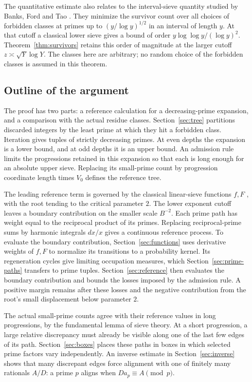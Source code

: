 The quantitative estimate also relates to the interval-sieve quantity
studied by Banks, Ford and Tao \cite[Sections~1.3--1.4]{BanksFordTao2023}.
They minimize the survivor count over all choices of forbidden classes
at primes up to $(y/\log y)^{1/2}$ in an interval of length $y$.
At that cutoff a classical lower sieve gives a bound of order
$y\log\log y/(\log y)^2$.
Theorem~\ref{thm:survivors} retains this order of magnitude at the
larger cutoff $z\asymp\sqrt Y\log Y$.
The classes here are arbitrary; no random choice of the forbidden
classes is assumed in this theorem.

\subsection*{Outline of the argument}

The proof has two parts: a reference calculation for a decreasing-prime
expansion, and a comparison with the actual residue classes.
Section~\ref{sec:tree} partitions discarded integers by the least
prime at which they hit a forbidden class. Iteration gives tuples of
strictly decreasing primes.
At even depths the expansion is a lower bound, and at odd depths it
is an upper bound. An admission rule limits the progressions retained
in this expansion so that each is long enough for an absolute upper
sieve. Replacing its small-prime count by progression coordinate
length times $V_0$ defines the reference tree.

The leading reference term is governed by the classical linear-sieve
functions $f,F$ \cite[Section~21.2.2]{MontgomeryVaughanII}, with the
root tending to the critical parameter $2$. The lower exponent cutoff
leaves a boundary contribution on the smaller scale $B^{-2}$.
Each prime path has weight equal to the reciprocal product of its
primes. Replacing reciprocal-prime sums by harmonic integrals $dx/x$
gives a continuous reference process. To evaluate the boundary
contribution, Section~\ref{sec:functions} uses derivative weights of
$f,F$ to normalize its transitions to a probability kernel.
Its regeneration cycles give limiting occupation measures,
which Section~\ref{sec:prime-paths} transfers to prime tuples.
Section~\ref{sec:reference} then evaluates the boundary contribution
and bounds the losses imposed by the admission rule. A positive
margin remains after these losses and the negative contribution from
the root's small displacement below parameter $2$.

The actual small-prime counts agree with their reference values in
long progressions, by the fundamental lemma of sieve theory.
At a short progression, a large relative discrepancy must already be
visible along one of the last few edges of its path.
Section~\ref{sec:boxes} places these paths in boxes in which selected
prime factors vary independently. An inverse estimate in
Section~\ref{sec:inverse} shows that many discrepant edges force
alignment with one of finitely many rationals $A/D$: a prime $p$
aligns when $Da_p\equiv A\pmod p$.

